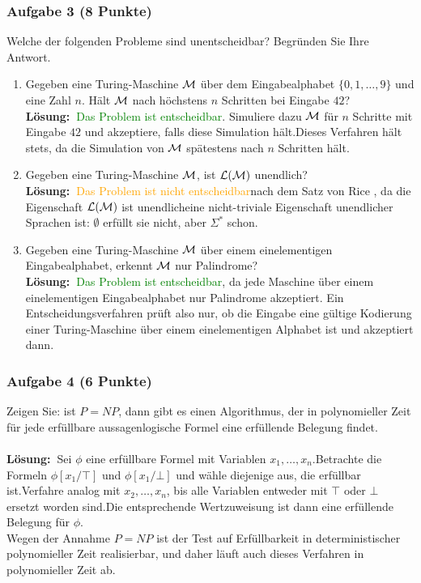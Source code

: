 \documentclass[a4paper,10pt]{article}
\newcommand{\f}[1]{\textbf{#1}}
\newcommand{\LOES}{\f{Lösung:~}}
\newcommand{\LANG}{\mathcal{L}}
\newcommand{\SIGS}{\Sigma^{*}}
\begin{document}
\subsubsection*{Aufgabe 3 (8 Punkte)}
Welche der folgenden Probleme sind unentscheidbar? Begründen Sie Ihre Antwort.
\begin{enumerate}
\item Gegeben eine Turing-Maschine $\mathcal{M}$ über dem Eingabealphabet $\{0,1,\dots,9\}$ und eine Zahl $n$. Hält $\mathcal{M}$ nach höchstens $n$ Schritten bei Eingabe $42$? \\
\LOES \textcolor{green}{Das Problem ist entscheidbar}\POINT. Simuliere dazu $\mathcal{M}$ für $n$ Schritte mit Eingabe $42$ und akzeptiere, falls diese Simulation hält.\POINT Dieses Verfahren hält stets, da die Simulation von $\mathcal{M}$ spätestens nach $n$ Schritten hält.\POINT 
\item Gegeben eine Turing-Maschine $\mathcal{M}$, ist $\LANG(\M)$ unendlich? \\
\LOES \textcolor{orange}{Das Problem ist nicht entscheidbar}\POINT nach dem Satz von Rice \POINT, da die Eigenschaft \glqq $\LANG(\M)$ ist unendlich\grqq eine nicht-triviale Eigenschaft unendlicher Sprachen ist: $\emptyset$ erfüllt sie nicht, aber $\SIGS$ schon.\POINT
\item Gegeben eine Turing-Maschine $\mathcal{M}$ über einem einelementigen Eingabealphabet, erkennt $\mathcal{M}$ nur Palindrome? \\
\LOES \textcolor{green}{Das Problem ist entscheidbar}\POINT, da jede Maschine über einem einelementigen Eingabealphabet nur Palindrome akzeptiert. Ein Entscheidungsverfahren prüft also nur, ob die Eingabe eine gültige Kodierung einer Turing-Maschine über einem einelementigen Alphabet ist und akzeptiert dann.\POINT
\end{enumerate}

\subsubsection*{Aufgabe 4 (6 Punkte)}
Zeigen Sie: ist $P = NP$, dann gibt es einen Algorithmus, der in polynomieller Zeit für jede erfüllbare aussagenlogische Formel eine erfüllende Belegung findet. \\\\
\LOES Sei $\phi$ eine erfüllbare Formel mit Variablen $x_1,\dots,x_n$.\POINT Betrachte die Formeln $\phi[x_1/\top]$ und $\phi[x_1/\bot]$ und wähle diejenige aus, die erfüllbar ist.\POINT Verfahre analog mit $x_2,\dots,x_n$, bis alle Variablen entweder mit $\top$ oder $\bot$ ersetzt worden sind.\POINT Die entsprechende Wertzuweisung ist dann eine erfüllende Belegung für $\phi$.\POINT \\
Wegen der Annahme $P = NP$ ist der Test auf Erfüllbarkeit in deterministischer polynomieller Zeit realisierbar\POINT, und daher läuft auch dieses Verfahren in polynomieller Zeit ab.\POINT
\end{document}
